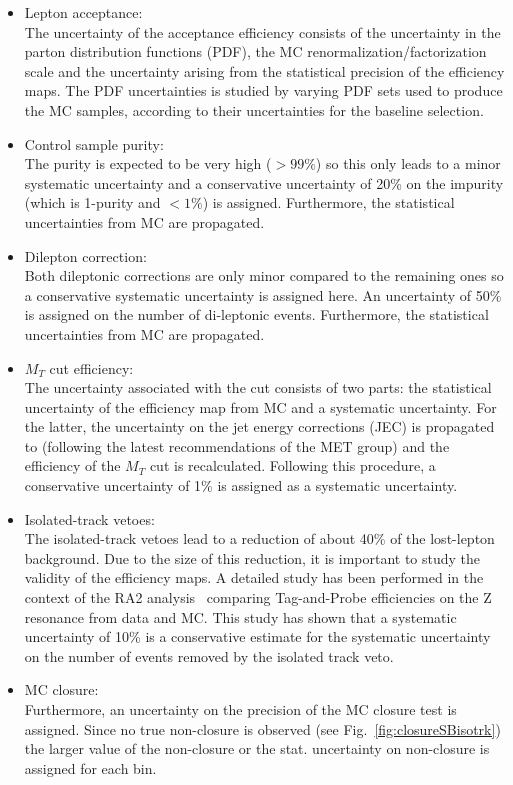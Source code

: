 \begin{itemize}
\item Lepton acceptance:\\
  The uncertainty of the acceptance efficiency consists of the uncertainty
  in the parton distribution functions (PDF), the MC renormalization/factorization scale
  and the uncertainty arising from the statistical precision of the efficiency maps.
  The PDF uncertainties is studied by varying PDF sets used to produce the
  MC samples, according to their uncertainties for the baseline selection.
\item Control sample purity:\\
The purity is expected to be very high ($>99\%$) so this only leads to a minor systematic uncertainty and a conservative uncertainty of 20\% on the impurity (which is 1-purity and $<1\%$) is assigned. Furthermore, the statistical uncertainties from MC are propagated.
\item Dilepton correction:\\
Both dileptonic corrections are only minor compared to the remaining ones so a conservative systematic uncertainty is assigned here.
An uncertainty of 50\% is assigned on the number of di-leptonic events. Furthermore, the statistical uncertainties from MC are propagated.
\item $M_T$ cut efficiency:\\
  The uncertainty associated with the \MT cut consists of two parts: the statistical uncertainty of the efficiency map from MC and a systematic uncertainty. For the latter, the uncertainty on the jet energy corrections (JEC) is propagated to \MET (following the latest recommendations of the MET group) and the efficiency of the $M_T$ cut is recalculated. Following this procedure, a conservative uncertainty of 1\% is assigned as a systematic uncertainty. 
\item Isolated-track vetoes:\\
  The isolated-track vetoes lead to a reduction of about 40\%
  of the lost-lepton background. Due to the size of this reduction,
  it is important to study the validity of the efficiency maps. A detailed study has been performed in the context of the RA2 analysis~\cite{Sirunyan:2017cwe} comparing Tag-and-Probe efficiencies on the Z resonance from data and MC. This study has shown that a systematic uncertainty of 10\% is a conservative estimate for the systematic uncertainty on the number of events removed by the isolated track veto.
\item MC closure:\\
Furthermore, an uncertainty on the precision of the MC closure test is assigned. Since no true non-closure is observed (see Fig.~\ref{fig:closureSBisotrk}) the larger value of the non-closure or the stat. uncertainty on non-closure is assigned for each bin. %
\end{itemize}

